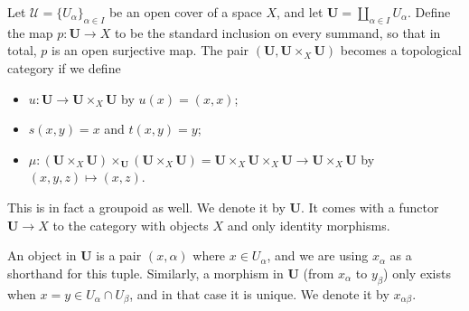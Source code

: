 \documentclass[a4paper,openany]{scrbook}
\begin{document}
\begin{example} \label{exa:covergroupoid}
Let $\mathcal U = \{U_\alpha\}_{\alpha \in I}$ be an open cover of a space $X$, and let $\mathbf U = \coprod_{\alpha \in I} U_\alpha$. Define the map $p\colon \mathbf U \to X$ to be the standard inclusion on every summand, so that in total, $p$ is an open surjective map.
The pair $(\mathbf U,\mathbf U \times_X \mathbf U)$ becomes a topological category if we define
\begin{itemize}
\item $u\colon \mathbf U \to \mathbf U \times_X \mathbf U$ by $u(x) = (x,x)$;
\item $s(x,y) = x$ and $t(x,y) = y$;
\item $\mu\colon (\mathbf U \times_X \mathbf U) \times_{\mathbf U} (\mathbf U \times_X \mathbf U) = \mathbf U \times_X \mathbf U \times_X \mathbf U \to \mathbf U \times_X \mathbf U$ by $(x,y,z) \mapsto (x,z)$.
\end{itemize}
This is in fact a groupoid as well. We denote it by $\mathbf U$. It comes with a functor $\mathbf U \to X$ to the category with objects $X$ and only identity morphisms.

An object in $\mathbf U$ is a pair $(x,\alpha)$ where $x \in U_\alpha$, and we are using $x_\alpha$ as a shorthand for this tuple. Similarly, a morphism in $\mathbf U$ (from $x_\alpha$ to $y_\beta$) only exists when $x=y \in U_\alpha \cap U_\beta$, and in that case it is unique. We denote it by $x_{\alpha\beta}$.
\end{example}
\end{document}
